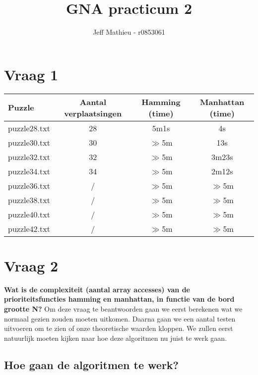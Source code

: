 \documentclass[12pt, letterpaper]{article}
\title{GNA practicum 2}
\author{Jeff Mathieu - r0853061}
\begin{document}
\maketitle

\newpage

\tableofcontents

\newpage

\section{Vraag 1}

\begin{center}
    \begin{tabular}{l c c c}
        
        Puzzle & Aantal verplaatsingen & Hamming (time) & Manhattan (time)\\
        \hline
        puzzle28.txt & 28 & 5m1s & 4s \\
        puzzle30.txt & 30 & $\gg$5m & 13s \\
        puzzle32.txt & 32 & $\gg$5m & 3m23s \\
        puzzle34.txt & 34 & $\gg$5m & 2m12s \\
        puzzle36.txt & / & $\gg$5m & $\gg$5m \\
        puzzle38.txt & / & $\gg$5m & $\gg$5m \\
        puzzle40.txt & / & $\gg$5m & $\gg$5m \\
        puzzle42.txt & / & $\gg$5m & $\gg$5m 
    \end{tabular}
\end{center}

\section{Vraag 2}
\textbf{Wat is de complexiteit (aantal array accesses) van de prioriteitsfuncties hamming en manhattan, in functie van de bord grootte N?}\newline
Om deze vraag te beantwoorden gaan we eerst berekenen wat we normaal gezien zouden
moeten uitkomen. Daarna gaan we een aantal testen uitvoeren om te zien of onze 
theoretische waarden kloppen. We zullen eerst natuurlijk moeten kijken naar hoe 
deze algoritmen nu juist te werk gaan.
\subsection{Hoe gaan de algoritmen te werk?}
\end{document}
